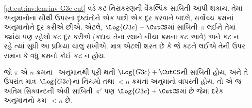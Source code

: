 \cref{pt:cut:inv:lem:inv-G3c-cut} વડે કટ-નિરાકરણની
વૈકલ્પિક સાબિતી આપી શકાય. તેમાં \CutCS{}
અનુમાનોના સૌથી ઉપરના દૃષ્ટાંતોને એક પછી એક
દૂર કરવાને બદલે, સર્વોચ્ચ ક્રમનાં \CutCS{}
અનુમાનોને દૂર કરીએ છીએ. એટલે,
$\Log{G3c} + \CutCS$માં સાબિતી~$\pi$ લઈને
તેમાં ક્યાંય પણ રહેલો કટ દૂર કરીએ
(કદાચ તેના સ્થાને નીચા ક્રમના કટ આવે)
અને કટ ન રહે ત્યાં સુધી આ પ્રક્રિયા ચાલુ રાખીએ.
માત્ર એટલી શરત છે કે જે કટને લઈએ તેની ઉપર
સમાન કે વધુ ક્રમનો કોઈ કટ ન હોય.

\begin{lem}
જો $\pi$ એ $n$ ક્રમના~\CutCS{} અનુમાનથી પૂરી થતી
$\Log{G3c}+\CutCS$ની સાબિતી હોય, અને તે ઉપરાંત
માત્ર~$\Log{G3c}$ના નિયમો તથા $<n$ ક્રમનાં
\CutCS{} અનુમાનો વાપરતી હોય, તો એ જ અંતિમ
સિક્વન્ટની એવી સાબિતી~$\pi'$ પણ
$\Log{G3c} + \CutCS$માં છે જેમાં દરેક
\CutCS{} અનુમાનનો ક્રમ~$<n$ છે.
\end{lem}


